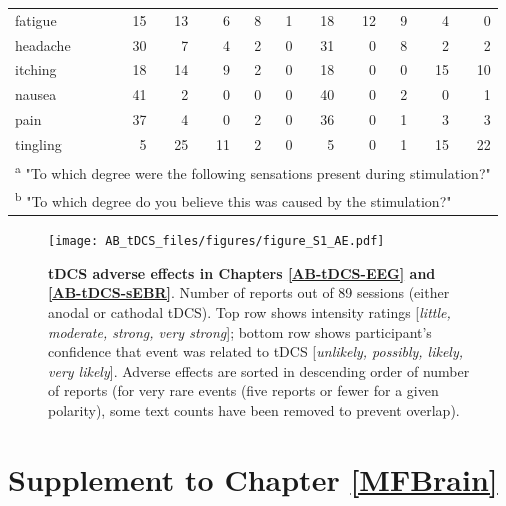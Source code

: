 \documentclass[11pt,]{memoir}
\newcommand{\blandscape}{\begin{landscape}}
\newcommand{\elandscape}{\end{landscape}}
\def\defstyle{Ruled} %
\begin{document}
\begin{longtable}{lrrrrrrrrrr}
\hspace{1em}fatigue & 15 & 13 & 6 & 8 & 1 & 18 & 12 & 9 & 4 & 0\\
\hspace{1em}headache & 30 & 7 & 4 & 2 & 0 & 31 & 0 & 8 & 2 & 2\\
\hspace{1em}itching & 18 & 14 & 9 & 2 & 0 & 18 & 0 & 0 & 15 & 10\\
\hspace{1em}nausea & 41 & 2 & 0 & 0 & 0 & 40 & 0 & 2 & 0 & 1\\
\hspace{1em}pain & 37 & 4 & 0 & 2 & 0 & 36 & 0 & 1 & 3 & 3\\
\hspace{1em}tingling & 5 & 25 & 11 & 2 & 0 & 5 & 0 & 1 & 15 & 22\\
\bottomrule
\multicolumn{11}{l}{\textsuperscript{a} "To which degree were the following sensations present during stimulation?"}\\
\multicolumn{11}{l}{\textsuperscript{b} "To which degree do you believe this was caused by the stimulation?"}\\
\end{longtable}
\endgroup{}

\endgroup

\newpage
\pagestyle{empty}
\changetext{}{}{-25mm}{}{}
\blandscape

\begin{figure}
\centering
\texttt{[image: AB\_tDCS\_files/figures/figure\_S1\_AE.pdf]}
\caption{\label{fig:fig-AB-tDCS-AE}\textbf{tDCS adverse effects in Chapters \ref{AB-tDCS-EEG} and \ref{AB-tDCS-sEBR}}. Number of reports out of 89 sessions (either anodal or cathodal tDCS). Top row shows intensity ratings {[}\emph{little, moderate, strong, very strong}{]}; bottom row shows participant's confidence that event was related to tDCS {[}\emph{unlikely, possibly, likely, very likely}{]}. Adverse effects are sorted in descending order of number of reports (for very rare events (five reports or fewer for a given polarity), some text counts have been removed to prevent overlap).}
\end{figure}



\newpage
\elandscape
\changetext{}{}{+25mm}{}{}
\pagestyle{\defstyle}

\hypertarget{MFBrain-supplement}{%
\chapter{Supplement to Chapter \ref{MFBrain}}\label{MFBrain-supplement}}
\end{document}
